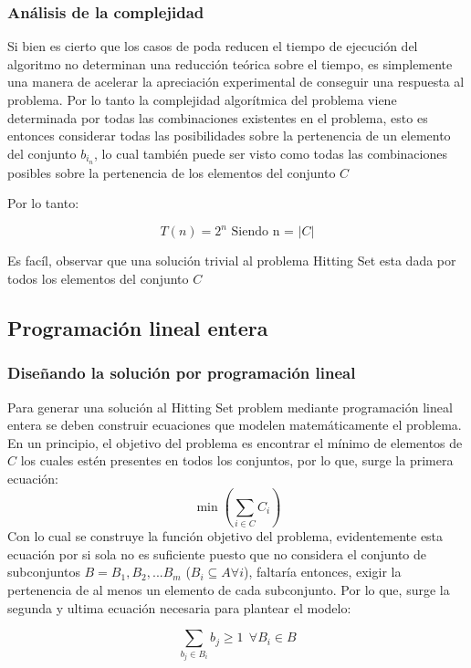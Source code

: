 \subsubsection{Análisis de la complejidad}

Si bien es cierto que los casos de poda reducen el tiempo de ejecución del algoritmo no determinan una reducción teórica sobre el tiempo, es simplemente una manera de acelerar la apreciación experimental de conseguir una respuesta al problema. Por lo tanto la complejidad algorítmica del problema viene determinada por todas las combinaciones existentes en el problema, esto es entonces considerar todas las posibilidades sobre la pertenencia de un elemento del conjunto $b_{i_n}$, lo cual también puede ser visto como todas las combinaciones posibles sobre la pertenencia de los elementos del conjunto $C$

Por lo tanto:

$$
    T(n) = 2^n \text{ Siendo n = $|C|$}
$$


Es facíl, observar que una solución trivial al problema Hitting Set esta dada por todos los elementos del conjunto $C$

\subsection{ Programación lineal entera}

\subsubsection{Diseñando la solución por programación lineal}

Para generar una solución al Hitting Set problem mediante programación lineal entera se deben construir ecuaciones que modelen matemáticamente el problema. En un principio, el objetivo del problema es encontrar el mínimo de elementos de $C$ los cuales estén presentes en todos los conjuntos, por lo que, surge la primera ecuación: 
$$
\min \left( \sum_{i \in C} C_{i} \right)
$$
Con lo cual se construye la función objetivo del problema, evidentemente esta ecuación por si sola no es suficiente puesto que no considera el conjunto de subconjuntos  $B = B_1, B_2, ... B_m$ ($B_i \subseteq A \forall i$), faltaría entonces, exigir la pertenencia de al menos un elemento de cada subconjunto. Por lo que, surge la segunda y ultima ecuación necesaria para plantear el modelo:

$$
\sum_{b_j \in B_i} b_j \geq 1 \ \ \forall B_i \in B 
$$

